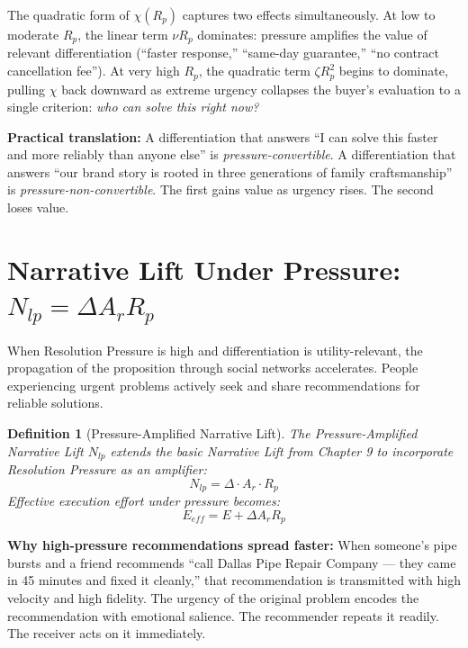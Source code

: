 \documentclass[12pt, openany]{book}
\theoremstyle{thmstyle}
\theoremstyle{defstyle}
\newtheorem{definition}{Definition}[chapter]
\begin{document}
The quadratic form of $\chi(R_p)$ captures two effects simultaneously. At low to moderate $R_p$, the linear term $\nu R_p$ dominates: pressure amplifies the value of relevant differentiation (``faster response,'' ``same-day guarantee,'' ``no contract cancellation fee''). At very high $R_p$, the quadratic term $\zeta R_p^2$ begins to dominate, pulling $\chi$ back downward as extreme urgency collapses the buyer's evaluation to a single criterion: \textit{who can solve this right now?}

\textbf{Practical translation:} A differentiation that answers ``I can solve this faster and more reliably than anyone else'' is \textit{pressure-convertible}. A differentiation that answers ``our brand story is rooted in three generations of family craftsmanship'' is \textit{pressure-non-convertible}. The first gains value as urgency rises. The second loses value.

\section{Narrative Lift Under Pressure: $N_{lp} = \Delta A_r R_p$}

When Resolution Pressure is high and differentiation is utility-relevant, the propagation of the proposition through social networks accelerates. People experiencing urgent problems actively seek and share recommendations for reliable solutions.

\begin{definition}[Pressure-Amplified Narrative Lift]
The Pressure-Amplified Narrative Lift $N_{lp}$ extends the basic Narrative Lift from Chapter 9 to incorporate Resolution Pressure as an amplifier:
\begin{equation}
N_{lp} = \Delta \cdot A_r \cdot R_p
\label{eq:narrative_lift_pressure}
\end{equation}
Effective execution effort under pressure becomes:
\begin{equation}
E_{eff} = E + \Delta A_r R_p
\label{eq:eff_effort_pressure}
\end{equation}
\end{definition}

\textbf{Why high-pressure recommendations spread faster:} When someone's pipe bursts and a friend recommends ``call Dallas Pipe Repair Company --- they came in 45 minutes and fixed it cleanly,'' that recommendation is transmitted with high velocity and high fidelity. The urgency of the original problem encodes the recommendation with emotional salience. The recommender repeats it readily. The receiver acts on it immediately.
\end{document}
